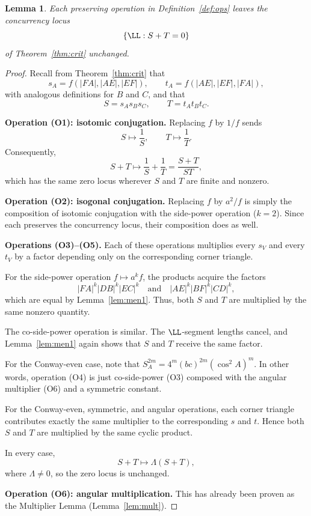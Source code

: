 \documentclass[12pt,a4paper]{amsart}
\newtheorem{lemma}[theorem]{Lemma}
\theoremstyle{remark}
\begin{document}
\begin{lemma}
\label{lem:closure}
Each preserving operation in Definition~\ref{def:ops} leaves the concurrency locus
\[
\{\LL: S+T=0\}
\]
of Theorem~\ref{thm:crit} unchanged.
\end{lemma}

\begin{proof}
Recall from Theorem~\ref{thm:crit} that
\[
s_A=f(|FA|,|AE|,|EF|),\qquad
t_A=f(|AE|,|EF|,|FA|),
\]
with analogous definitions for $B$ and $C$, and that
\[
S=s_As_Bs_C,\qquad
T=t_At_Bt_C.
\]

\smallskip
\noindent
\textbf{Operation (O1): isotomic conjugation.}
Replacing $f$ by $1/f$ sends
\[
S\longmapsto \frac1S,\qquad
T\longmapsto \frac1T.
\]
Consequently,
\[
S+T
\longmapsto
\frac1S+\frac1T
=
\frac{S+T}{ST},
\]
which has the same zero locus wherever $S$ and $T$ are finite and nonzero.

\smallskip
\noindent
\textbf{Operation (O2): isogonal conjugation.}
Replacing $f$ by $a^2/f$ is simply the composition of isotomic conjugation with
the side-power operation ($k=2$). Since each preserves the concurrency locus,
their composition does as well.

\smallskip
\noindent
\textbf{Operations (O3)--(O5).}
Each of these operations multiplies every $s_V$ and every $t_V$ by a factor
depending only on the corresponding corner triangle.

For the side-power operation $f\mapsto a^k f$, the products acquire the factors
\[
|FA|^k|DB|^k|EC|^k
\quad\text{and}\quad
|AE|^k|BF|^k|CD|^k,
\]
which are equal by Lemma~\ref{lem:men1}. Thus, both $S$ and $T$ are multiplied by the same
nonzero quantity.

The co-side-power operation is similar. The $\LL$-segment lengths cancel, and
Lemma~\ref{lem:men1} again shows that $S$ and $T$ receive the same factor.

For the Conway-even case, note that $S_A^{2m} = 4^m (bc)^{2m}(\cos^2 A)^m$.
In other words, operation (O4) is just co-side-power (O3) composed with the angular multiplier (O6)
and a symmetric constant.

For the Conway-even, symmetric, and angular operations, each corner triangle
contributes exactly the same multiplier to the corresponding $s$ and $t$. Hence
both $S$ and $T$ are multiplied by the same cyclic product.

In every case,
\[
S+T\longmapsto \Lambda(S+T),
\]
where $\Lambda\neq0$, so the zero locus is unchanged.

\smallskip
\noindent
\textbf{Operation (O6): angular multiplication.}
This has already been proven as the Multiplier Lemma (Lemma~\ref{lem:mult}).
\end{proof}
\end{document}
